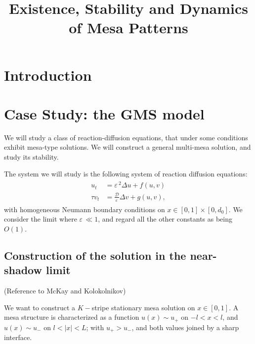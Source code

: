 \documentclass[a4paper,10pt]{article}
\title{Existence, Stability and Dynamics of Mesa Patterns}
\author{}
\newcommand{\De}{\ensuremath{\Delta}}
\newcommand{\Ep}{\ensuremath{\varepsilon\,}}
\newcommand{\DD}{\ensuremath{\mathcal{D}}}
\begin{document}
\maketitle

\begin{abstract}

\end{abstract}

\section{Introduction}

\section{Case Study: the GMS model}

We will study a class of reaction-diffusion equations, that under some conditions exhibit mesa-type solutions. We will construct a general multi-mesa solution, and study its stability.

The system we will study is the following system of reaction diffusion equations:
% 
\begin{equation*}
\label{eqn:gms1}
\begin{split}
\begin{aligned}
	u_t &= \Ep^2\De u + f(u,v) \\
	\tau v_t &= \frac{\DD}{\Ep}\De v + g(u,v),
\end{aligned}
\end{split}
\end{equation*}
% 
with homogeneous Neumann boundary conditions on $x\in[0,1]\times[0,d_0]$. We consider the limit where $\Ep\ll 1$, and regard all the other constants as being $O(1)$. 

\subsection{Construction of the solution in the near-shadow limit}

(Reference to McKay and Kolokolnikov)

We want to construct a $K-$stripe stationary mesa solution on $x\in[0,1]$. A mesa structure is characterized as a function $u(x)\sim u_+$ on $-l<x<l$, and $u(x)\sim u_-$ on $l<|x|<L$; with $u_+>u_-$, and both values joined by a sharp interface.
\end{document}
